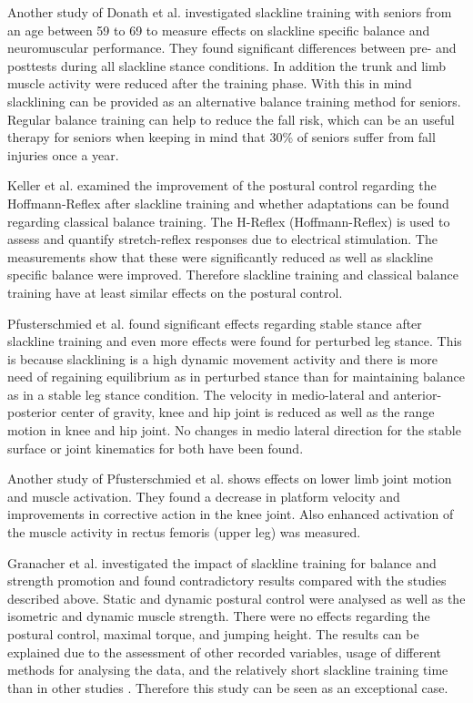 Another study of Donath et al. \cite{Donath2016-gm} investigated slackline training with seniors from an age between 59 to 69 to measure effects on slackline specific balance and neuromuscular performance. They found significant differences between pre- and posttests during all slackline stance conditions. In addition the trunk and limb muscle activity were reduced after the training phase. With this in mind slacklining can be provided as an alternative balance training method for seniors. Regular balance training can help to reduce the fall risk, which can be an useful therapy for seniors when keeping in mind that 30\% of seniors suffer from fall injuries once a year.

Keller et al. \cite{Keller2012-xh} examined the improvement of the postural control regarding the Hoffmann-Reflex after slackline training and whether adaptations can be found regarding classical balance training. The H-Reflex (Hoffmann-Reflex) is used to assess and quantify stretch-reflex responses due to electrical stimulation. The measurements show that these were significantly reduced as well as slackline specific balance were improved. Therefore slackline training and classical balance training have at least similar effects on the postural control.

Pfusterschmied et al. \cite{Pfusterschmied2013-yy} found significant effects regarding stable stance after slackline training and even more effects were found for perturbed leg stance. This is because slacklining is a high dynamic movement activity and there is more need of regaining equilibrium as in perturbed stance than for maintaining balance as in a stable leg stance condition. The velocity in medio-lateral and anterior-posterior center of gravity, knee and hip joint is reduced as well as the range motion in knee and hip joint. No changes in medio lateral direction for the stable surface or joint kinematics for both have been found.

Another study of Pfusterschmied et al. \cite{Pfusterschmied2013-kq} shows effects on lower limb joint motion and muscle activation. They found a decrease in platform velocity and improvements in corrective action in the knee joint. Also enhanced activation of the muscle activity in rectus femoris (upper leg) was measured.

Granacher et al. \cite{Granacher2010-ow} investigated the impact of slackline training for balance and strength promotion and found contradictory results compared with the studies described above. Static and dynamic postural control were analysed as well as the isometric and dynamic muscle strength. There were no effects regarding the postural control, maximal torque, and jumping height. The results can be explained due to the assessment of other recorded variables, usage of different methods for analysing the data, and the relatively short slackline training time than in other studies \cite{Pfusterschmied2013-yy}. Therefore this study can be seen as an exceptional case.

